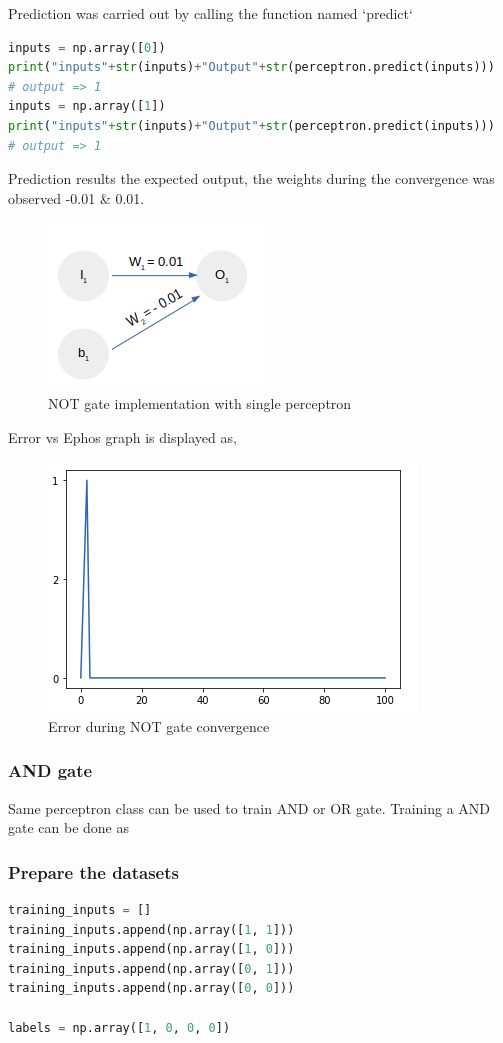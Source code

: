 \documentclass[a4paper,12pt]{report}
\begin{document}
Prediction was carried out by calling the function named `predict`
\begin{lstlisting}[language=Python,breaklines=true]
inputs = np.array([0])
print("inputs"+str(inputs)+"Output"+str(perceptron.predict(inputs)))
# output => 1
inputs = np.array([1])
print("inputs"+str(inputs)+"Output"+str(perceptron.predict(inputs))) 
# output => 1
\end{lstlisting}
Prediction results the expected output, the weights during the convergence was observed -0.01 \& 0.01.
\begin{figure}[htp]
\centering
\includegraphics[scale=0.80]{resources/image-08.png}
\caption{NOT gate implementation with single perceptron}
\label{}
\end{figure}
Error vs Ephos graph is displayed as,
\begin{figure}[htp]
\centering
\includegraphics[scale=0.80]{resources/image-07.png}
\caption{Error during NOT gate convergence}
\label{}
\end{figure}

\subsubsection*{AND gate}
Same perceptron class can be used to train AND or OR gate. Training a AND gate can be done as

\subsubsection*{Prepare the datasets}
\begin{lstlisting}[language=Python]
training_inputs = []
training_inputs.append(np.array([1, 1]))
training_inputs.append(np.array([1, 0]))
training_inputs.append(np.array([0, 1]))
training_inputs.append(np.array([0, 0]))

labels = np.array([1, 0, 0, 0])
\end{lstlisting}
\end{document}
